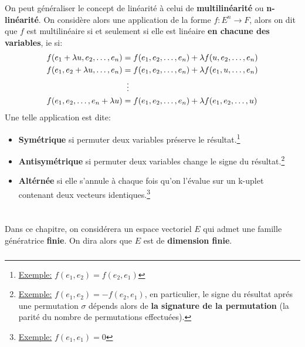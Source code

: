 On peut généraliser le concept de linéarité à celui de \textbf{multilinéarité} ou \textbf{n-linéarité}. On considère alors une application de la forme \(f : E^n \longrightarrow F\), alors on dit que \(f\) est multilinéaire si et seulement si elle est linéaire \textbf{en chacune des variables}, ie si:
\begin{align*}
   f(e_1 + \lambda u, e_2, \ldots, e_n) &= f(e_1, e_2, \ldots, e_n) + \lambda f(u, e_2, \ldots, e_n)  \\
   f(e_1, e_2  + \lambda u, \ldots, e_n) &= f(e_1, e_2, \ldots, e_n) + \lambda f(e_1, u, \ldots, e_n) \\
   & \vdotswithin{=} \\   
   f(e_1, e_2 , \ldots, e_n + \lambda u) &= f(e_1, e_2, \ldots, e_n) + \lambda f(e_1, e_2, \ldots, u)
\end{align*}
Une telle application est dite:
\begin{itemize}
   \item \textbf{Symétrique} si permuter deux variables préserve le résultat.\footnote[1]{\underline{Exemple:} \(f(e_1, e_2) = f(e_2, e_1)\)}
   \item \textbf{Antisymétrique} si permuter deux variables change le signe du résultat.\footnote[2]{\underline{Exemple:} \(f(e_1, e_2) = -f(e_2, e_1)\), en particulier, le signe du résultat aprés une permutation \(\sigma\) dépends alors de \textbf{la signature de la permutation} (la parité du nombre de permutations effectuées).}
   \item  \textbf{Altérnée} si elle s'annule à chaque fois qu'on l'évalue sur un k-uplet contenant deux vecteurs identiques.\footnote[3]{\underline{Exemple:} \(f(e_1, e_1) = 0\)}
\end{itemize}

\chapter*{} %

Dans ce chapitre, on considérera un espace vectoriel \(E\) qui admet une famille génératrice \textbf{finie}. On dira alors que \(E\) est de \textbf{dimension finie}.

\subsection*{}

